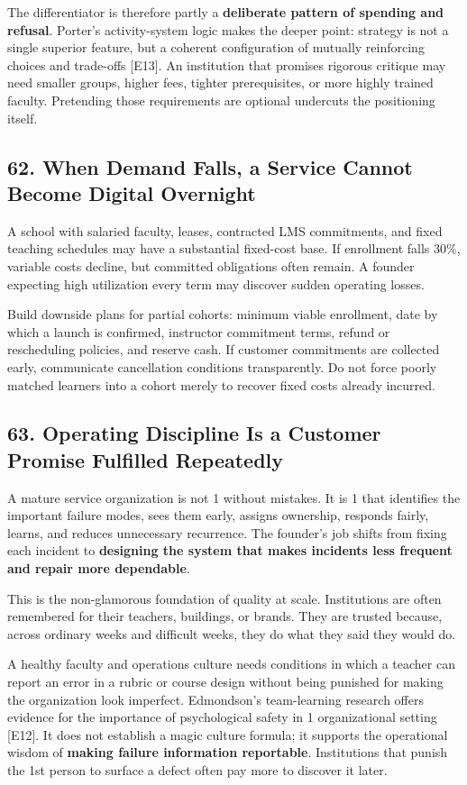 The differentiator is therefore partly a \textbf{deliberate pattern of spending and refusal}. Porter's activity-system logic makes the deeper point: strategy is not a single superior feature, but a coherent configuration of mutually reinforcing choices and trade-offs [E13]. An institution that promises rigorous critique may need smaller groups, higher fees, tighter prerequisites, or more highly trained faculty. Pretending those requirements are optional undercuts the positioning itself.

\subsection*{62. When Demand Falls, a Service Cannot Become Digital Overnight}

A school with salaried faculty, leases, contracted LMS commitments, and fixed teaching schedules may have a substantial fixed-cost base. If enrollment falls 30\%, variable costs decline, but committed obligations often remain. A founder expecting high utilization every term may discover sudden operating losses.

Build downside plans for partial cohorts: minimum viable enrollment, date by which a launch is confirmed, instructor commitment terms, refund or rescheduling policies, and reserve cash. If customer commitments are collected early, communicate cancellation conditions transparently. Do not force poorly matched learners into a cohort merely to recover fixed costs already incurred.

\subsection*{63. Operating Discipline Is a Customer Promise Fulfilled Repeatedly}

A mature service organization is not 1 without mistakes. It is 1 that identifies the important failure modes, sees them early, assigns ownership, responds fairly, learns, and reduces unnecessary recurrence. The founder's job shifts from fixing each incident to \textbf{designing the system that makes incidents less frequent and repair more dependable}.

This is the non-glamorous foundation of quality at scale. Institutions are often remembered for their teachers, buildings, or brands. They are trusted because, across ordinary weeks and difficult weeks, they do what they said they would do.

A healthy faculty and operations culture needs conditions in which a teacher can report an error in a rubric or course design without being punished for making the organization look imperfect. Edmondson's team-learning research offers evidence for the importance of psychological safety in 1 organizational setting [E12]. It does not establish a magic culture formula; it supports the operational wisdom of \textbf{making failure information reportable}. Institutions that punish the 1st person to surface a defect often pay more to discover it later.
